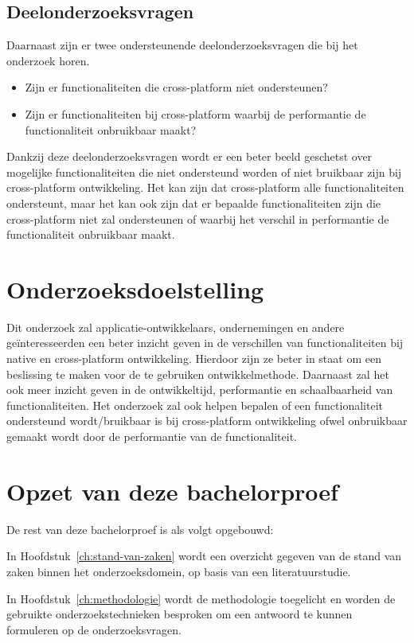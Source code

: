 \subsection{Deelonderzoeksvragen}
Daarnaast zijn er twee ondersteunende deelonderzoeksvragen die bij het onderzoek horen.
\begin{itemize}
    \item Zijn er functionaliteiten die cross-platform niet ondersteunen?
    \item Zijn er functionaliteiten bij cross-platform waarbij de performantie de functionaliteit onbruikbaar maakt?
\end{itemize}
Dankzij deze deelonderzoeksvragen wordt er een beter beeld geschetst over mogelijke functionaliteiten die niet 
ondersteund worden of niet bruikbaar zijn bij cross-platform ontwikkeling. Het kan zijn dat cross-platform alle functionaliteiten ondersteunt,
maar het kan ook zijn dat er bepaalde functionaliteiten zijn die cross-platform niet zal ondersteunen of waarbij het verschil 
in performantie de functionaliteit onbruikbaar maakt.


\section{Onderzoeksdoelstelling}%
\label{sec:onderzoeksdoelstelling}
Dit onderzoek zal applicatie-ontwikkelaars, ondernemingen en andere geïnteresseerden een beter inzicht geven in de verschillen van functionaliteiten 
bij native en cross-platform ontwikkeling. Hierdoor zijn ze beter in staat om een beslissing te maken voor de te gebruiken ontwikkelmethode. 
Daarnaast zal het ook meer inzicht geven in de ontwikkeltijd, performantie en schaalbaarheid van functionaliteiten. 
Het onderzoek zal ook helpen bepalen of een functionaliteit ondersteund wordt/bruikbaar is bij cross-platform ontwikkeling ofwel 
onbruikbaar gemaakt wordt door de performantie van de functionaliteit.
 

\section{Opzet van deze bachelorproef}%
\label{sec:opzet-bachelorproef}
De rest van deze bachelorproef is als volgt opgebouwd:

In Hoofdstuk~\ref{ch:stand-van-zaken} wordt een overzicht gegeven van de stand van zaken binnen 
het onderzoeksdomein, op basis van een literatuurstudie.

In Hoofdstuk~\ref{ch:methodologie} wordt de methodologie toegelicht en worden de gebruikte onderzoekstechnieken 
besproken om een antwoord te kunnen formuleren op de onderzoeksvragen.

